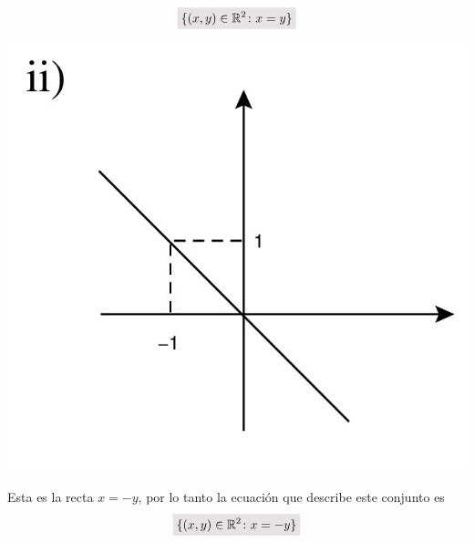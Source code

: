 \documentclass[a4paper,10pt]{article}
\newcommand{\real}{\mathbb{R}}
\newcommand{\resalta}[1]{\colorbox{g}{$\displaystyle #1$}}
\begin{document}
\begin{enumerate}
\begin{enumerate}[label = \roman*)]
\begin{minipage}[c]{0.7\linewidth}
\begin{equation}
                    \notag \resalta{\{(x,y)\in \real^{2} \colon x=y\}}
                \end{equation}
            \end{minipage}
            \begin{minipage}[c]{0.3\linewidth}
                \centering
                    \includegraphics[scale=0.15]{4ii-2}
            \end{minipage}
            \begin{minipage}[c]{0.7\linewidth}
                Esta es la recta $x=-y$, por lo tanto la ecuaci\'on que describe este conjunto es
                \begin{equation}
                    \notag \resalta{\{(x,y)\in \real^{2} \colon x=-y\}}
                \end{equation}
            \end{minipage}
            \begin{minipage}[c]{0.3\linewidth}
                \centering

\end{minipage}
\end{enumerate}
\end{enumerate}
\end{document}
